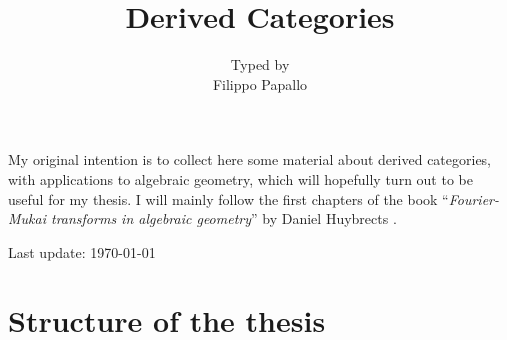 \documentclass[a4paper, 10pt, oneside, DIV=9, chapterprefix=true, numbers=enddot,bibliography=totoc]{scrbook}
\title{Derived Categories}
\author{ }
\date{{\normalsize Typed by}\\
	Filippo Papallo}
\begin{document}
\setlength{\parindent}{0pt}
\setlength{\parskip}{4pt}

\frontmatter
{}
\renewcommand{\thedummy}{\arabic{dummy}}
\maketitle
My original intention is to collect here some 
material about derived categories, with applications to
algebraic geometry, which will hopefully turn out to be 
useful for my thesis.
I will mainly follow the first chapters of the book
``\textit{Fourier-Mukai transforms in algebraic geometry}''
by Daniel Huybrects \parencite[]{huybrechts}. 

\hrulefill

Last update: \today
	
	


\tableofcontents

	\listoftodos

\setcounter{llecture}{0}
\mainmatter{}
\renewcommand{\thedummy}{\thechapter.\arabic{dummy}}
\renewcommand{\thechapter}{\Roman{chapter}}





\chapter{Structure of the thesis}

	
\end{document}
